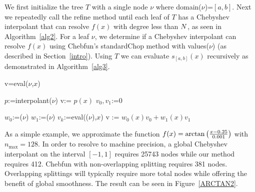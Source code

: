 We first initialize the tree $T$ with a single node $\nu$ where \textsf{domain}($\nu$)=$[a,b]$. Next we repeatedly call the refine method until each leaf of $T$ has a Chebyshev interpolant that can resolve $f(x)$ with degree less than $N$, as seen in Algorithm~\ref{alg2}. For a leaf $\nu$, we determine if a Chebyshev interpolant can resolve $f(x)$ using Chebfun's standardChop method with \textsf{values}($\nu$) (as described in Section~\ref{intro}). Using $T$ we can evaluate $s_{[a,b]}(x)$ recursively as demonstrated in Algorithm~\ref{alg3}. 





\begin{algorithm}[!h]
\caption{v=eval($\nu$,$x$)}
\label{alg3}
\begin{algorithmic}
\STATE $p$:=\textsf{interpolant}($\nu$)
\STATE v:= $p(x)$
\ELSE
\STATE $v_0,v_1$:=0

\STATE $w_0$:=($\nu$)
\STATE $w_1$:=($\nu$)
\STATE $v_k$:=eval(($\nu$),$x$)
\ENDIF
\ENDFOR
\STATE v := $w_0(x)v_0 + w_1(x)v_1$
\ENDIF
\end{algorithmic}
\end{algorithm}

As a simple example, we approximate the function $f(x)=\arctan \left( \frac{x-0.25}{0.001} \right)$ with $n_{\max}=128$. In order to resolve to machine precision, a global Chebyshev interpolant on the interval $[-1,1]$ requires 25743 nodes while our method requires 412. Chebfun with non-overlapping splitting requires 381 nodes. Overlapping splittings will typically require more total nodes while offering the benefit of global smoothness. The result can be seen in Figure~\ref{ARCTAN2}.

